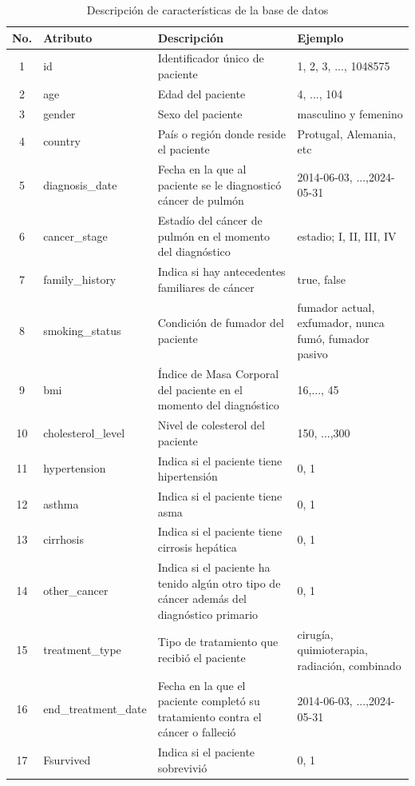 \documentclass[10pt,journal,compsoc]{IEEEtran}
\begin{document}
\begin{table}[h!]
\centering
\begin{tabularx}{\columnwidth}{|c|X|X|X|}
\hline
\textbf{No.} & \textbf{Atributo} & \textbf{Descripción} & \textbf{Ejemplo} \\ \hline
1  & id & Identificador único de paciente &1, 2, 3, ..., 1048575 \\ \hline
2  & age & Edad del paciente & 4, ..., 104 \\ \hline
3  & gender & Sexo del paciente  & masculino y femenino \\ \hline
4  & country & País o región donde reside el paciente & Protugal, Alemania, etc  \\ \hline
5  & diagnosis\_date & Fecha en la que al paciente se le diagnosticó cáncer de pulmón & 2014-06-03, ...,2024-05-31 \\ \hline
6  & cancer\_stage & Estadío del cáncer de pulmón en el momento del diagnóstico & estadio; I,  II, III, IV \\ \hline
7  & family\_history & Indica si hay antecedentes familiares de cáncer & true, false \\ \hline
8  & smoking\_status & Condición de fumador del paciente &  fumador actual, exfumador, nunca fumó, fumador pasivo\\ \hline
9  & bmi & Índice de Masa Corporal del paciente en el momento del diagnóstico & 16,..., 45 \\ \hline
10 & cholesterol\_level & Nivel de colesterol del paciente & 150, ...,300 \\ \hline
11 & hypertension & Indica si el paciente tiene hipertensión & 0, 1 \\ \hline
12 & asthma & Indica si el paciente tiene asma &  0, 1 \\ \hline
13 & cirrhosis & Indica si el paciente tiene cirrosis hepática & 0, 1 \\ \hline
14 & other\_cancer & Indica si el paciente ha tenido algún otro tipo de cáncer además del diagnóstico primario & 0, 1 \\ \hline
15 & treatment\_type & Tipo de tratamiento que recibió el paciente & cirugía, quimioterapia, radiación, combinado \\ \hline
16 & end\_treatment\_date & Fecha en la que el paciente completó su tratamiento contra el cáncer o falleció & 2014-06-03, ...,2024-05-31 \\ \hline
17 & Fsurvived & Indica si el paciente sobrevivió & 0, 1 \\ \hline
\end{tabularx}
\caption{Descripción de características de la base de datos}
\label{tab:caracteristicas}
\end{table}
\end{document}
